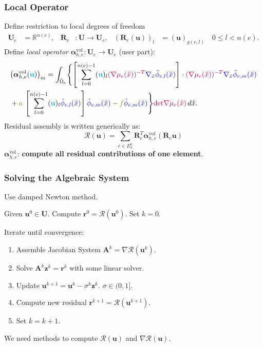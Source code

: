 \begin{frame}
\frametitle{Local Operator}
Define restriction to local degrees of freedom
\begin{align*}
\mathbf{U}_e &= \mathbb{R}^{n(e)}, &
\mathbf{R}_e &: \mathbf{U} \to \mathbf{U}_e, &
\left(\mathbf{R}_e(\mathbf{u})\right)_l &= (\mathbf{u})_{g(e,l)} \quad 0\leq l < n(e).
\end{align*}
Define \textit{local operator} $\bm{\alpha}^{\text{vol}}_{h,e} : \mathbf{U}_e \to \mathbf{U}_e$ (user part):
{\small\begin{equation*}
\begin{split}
&\bigl(\bm{\alpha}^{\text{vol}}_{h,e}({\color{cyan}\mathbf{u}})\bigr)_m  = \int_{\hat\Omega_e}
\Biggl\{\left[ \sum_{l=0}^{n(e)-1} ({\color{cyan}\mathbf{u}})_{l} {\color{purple}
(\nabla \mu_e(\hat{x}))^{-T}} {\color{blue}\nabla_{\hat{x}} \hat\phi_{e,l}(\hat{x})} \right]
\cdot {\color{purple}(\nabla \mu_e(\hat{x}))^{-T}} {\color{blue}\nabla_{\hat{x}} \hat\phi_{e,m}(\hat{x})}\\
& + {\color{olive} a} \, \left[ \sum_{l=0}^{n(e)-1} ({\color{cyan}\mathbf{u}})_{l}
 {\color{blue}\hat\phi_{e,l}(\hat{x})} \right] {\color{blue}\hat\phi_{e,m}(\hat{x})}
- {\color{olive} f} {\color{blue}\hat\phi_{e,m}(\hat{x})} \Biggr\} {\color{purple}\text{det} \nabla\mu_e(\hat{x})} \, d\hat{x} .
\end{split}
\end{equation*}}
Residual assembly is written generically as:
\begin{equation*}
\mathcal{R}(\mathbf{u}) = \sum_{e\in E_h^0} \mathbf{R}_e^T \bm{\alpha}^{\text{vol}}_{h,e} (\mathbf{R}_e \mathbf{u})
\end{equation*}
$\bm{\alpha}^{\text{vol}}_{h,e}$: \textbf{compute all residual contributions of one element}.
\end{frame}


\begin{frame}
\frametitle{Solving the Algebraic System}
Use damped Newton method.

Given $\mathbf{u}^0\in\mathbf{U}$. Compute $\mathbf{r}^0 = \mathcal{R}(\mathbf{u}^0)$. Set $k=0$.

Iterate until convergence:
\begin{enumerate}
\item Assemble Jacobian System $\mathbf{A}^k = \nabla\mathcal{R}(\mathbf{u}^k)$.
\item Solve $\mathbf{A}^k \mathbf{z}^k = \mathbf{r}^k$ with some linear solver.
\item Update $\mathbf{u}^{k+1} = \mathbf{u}^{k} - \sigma^k \mathbf{z}^{k}$. $\sigma\in(0,1]$.
\item Compute new residual $\mathbf{r}^{k+1} = \mathcal{R}(\mathbf{u}^{k+1})$.
\item Set $k = k +1$.
\end{enumerate}

We need methods to compute $\mathcal{R}(\mathbf{u})$ and $\nabla\mathcal{R}(\mathbf{u})$.
\end{frame}

